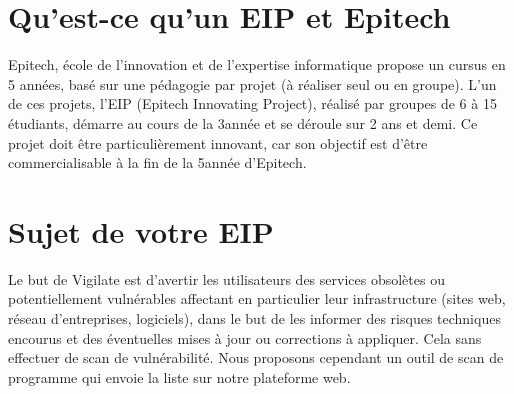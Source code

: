 \section{Qu'est-ce qu’un EIP et Epitech}
Epitech,  école de l'innovation et de l'expertise informatique propose un cursus en 5 années, basé sur une pédagogie par projet (à réaliser seul ou en groupe). L'un de ces projets, l’EIP (Epitech Innovating Project), réalisé par groupes de 6 à 15 étudiants, démarre au cours de la 3\ieme année et se déroule sur 2 ans et demi. Ce  projet doit être particulièrement innovant, car son objectif est d’être commercialisable à la fin de la 5\ieme année d’Epitech.

\section{Sujet de votre EIP}
Le but de Vigilate est d’avertir les utilisateurs des services obsolètes ou potentiellement vulnérables affectant en particulier leur infrastructure (sites web, réseau d'entreprises, logiciels), dans le but de les informer des risques techniques encourus et des éventuelles mises à jour ou corrections à appliquer.
Cela sans effectuer de scan de vulnérabilité.
Nous proposons cependant un outil de scan de programme qui envoie la liste sur notre plateforme web.

